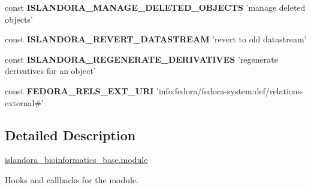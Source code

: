 \begin{DoxyCompactItemize}
\item 
\hypertarget{islandora__bioinformatics__base_8module_ac7745e9043a8f3e2c0801870aa6332ec}{const {\bfseries I\+S\+L\+A\+N\+D\+O\+R\+A\+\_\+\+M\+A\+N\+A\+G\+E\+\_\+\+D\+E\+L\+E\+T\+E\+D\+\_\+\+O\+B\+J\+E\+C\+T\+S} 'manage deleted objects'}\label{islandora__bioinformatics__base_8module_ac7745e9043a8f3e2c0801870aa6332ec}

\item 
\hypertarget{islandora__bioinformatics__base_8module_a7fc8b535af1cb2c093b483b55b0a9fb6}{const {\bfseries I\+S\+L\+A\+N\+D\+O\+R\+A\+\_\+\+R\+E\+V\+E\+R\+T\+\_\+\+D\+A\+T\+A\+S\+T\+R\+E\+A\+M} 'revert to old datastream'}\label{islandora__bioinformatics__base_8module_a7fc8b535af1cb2c093b483b55b0a9fb6}

\item 
\hypertarget{islandora__bioinformatics__base_8module_adfcbec4e1beb4c9b14f56d25bffb04aa}{const {\bfseries I\+S\+L\+A\+N\+D\+O\+R\+A\+\_\+\+R\+E\+G\+E\+N\+E\+R\+A\+T\+E\+\_\+\+D\+E\+R\+I\+V\+A\+T\+I\+V\+E\+S} 'regenerate derivatives for an object'}\label{islandora__bioinformatics__base_8module_adfcbec4e1beb4c9b14f56d25bffb04aa}

\item 
\hypertarget{islandora__bioinformatics__base_8module_ab4da6edb4e2ac90967a626a2d8ec49fd}{const {\bfseries F\+E\+D\+O\+R\+A\+\_\+\+R\+E\+L\+S\+\_\+\+E\+X\+T\+\_\+\+U\+R\+I} 'info\+:fedora/fedora-\/system\+:def/relations-\/external\#'}\label{islandora__bioinformatics__base_8module_ab4da6edb4e2ac90967a626a2d8ec49fd}

\end{DoxyCompactItemize}


\subsection{Detailed Description}
\hyperlink{islandora__bioinformatics__base_8module}{islandora\+\_\+bioinformatics\+\_\+base.\+module}

Hooks and callbacks for the module. 

